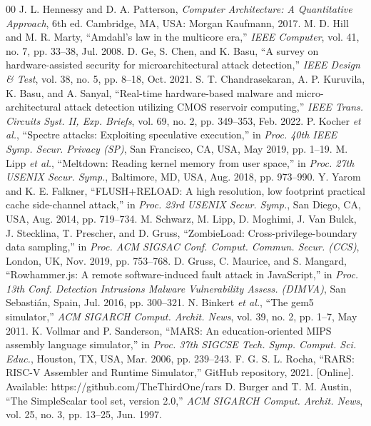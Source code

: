 \documentclass[journal,twocolumn,10pt]{IEEEtran}
\begin{document}
\begin{thebibliography}{00}
 J. L. Hennessy and D. A. Patterson, \textit{Computer Architecture: A Quantitative Approach}, 6th ed. Cambridge, MA, USA: Morgan Kaufmann, 2017.
 M. D. Hill and M. R. Marty, ``Amdahl's law in the multicore era,'' \textit{IEEE Computer}, vol. 41, no. 7, pp. 33--38, Jul. 2008.
 D. Ge, S. Chen, and K. Basu, ``A survey on hardware-assisted security for microarchitectural attack detection,'' \textit{IEEE Design \& Test}, vol. 38, no. 5, pp. 8--18, Oct. 2021.
 S. T. Chandrasekaran, A. P. Kuruvila, K. Basu, and A. Sanyal, ``Real-time hardware-based malware and micro-architectural attack detection utilizing CMOS reservoir computing,'' \textit{IEEE Trans. Circuits Syst. II, Exp. Briefs}, vol. 69, no. 2, pp. 349--353, Feb. 2022.
 P. Kocher \textit{et al.}, ``Spectre attacks: Exploiting speculative execution,'' in \textit{Proc. 40th IEEE Symp. Secur. Privacy (SP)}, San Francisco, CA, USA, May 2019, pp. 1--19.
 M. Lipp \textit{et al.}, ``Meltdown: Reading kernel memory from user space,'' in \textit{Proc. 27th USENIX Secur. Symp.}, Baltimore, MD, USA, Aug. 2018, pp. 973--990.
 Y. Yarom and K. E. Falkner, ``FLUSH+RELOAD: A high resolution, low footprint practical cache side-channel attack,'' in \textit{Proc. 23rd USENIX Secur. Symp.}, San Diego, CA, USA, Aug. 2014, pp. 719--734.
 M. Schwarz, M. Lipp, D. Moghimi, J. Van Bulck, J. Stecklina, T. Prescher, and D. Gruss, ``ZombieLoad: Cross-privilege-boundary data sampling,'' in \textit{Proc. ACM SIGSAC Conf. Comput. Commun. Secur. (CCS)}, London, UK, Nov. 2019, pp. 753--768.
 D. Gruss, C. Maurice, and S. Mangard, ``Rowhammer.js: A remote software-induced fault attack in JavaScript,'' in \textit{Proc. 13th Conf. Detection Intrusions Malware Vulnerability Assess. (DIMVA)}, San Sebasti\'an, Spain, Jul. 2016, pp. 300--321.
 N. Binkert \textit{et al.}, ``The gem5 simulator,'' \textit{ACM SIGARCH Comput. Archit. News}, vol. 39, no. 2, pp. 1--7, May 2011.
 K. Vollmar and P. Sanderson, ``MARS: An education-oriented MIPS assembly language simulator,'' in \textit{Proc. 37th SIGCSE Tech. Symp. Comput. Sci. Educ.}, Houston, TX, USA, Mar. 2006, pp. 239--243.
 F. G. S. L. Rocha, ``RARS: RISC-V Assembler and Runtime Simulator,'' GitHub repository, 2021. [Online]. Available: https://github.com/TheThirdOne/rars
 D. Burger and T. M. Austin, ``The SimpleScalar tool set, version 2.0,'' \textit{ACM SIGARCH Comput. Archit. News}, vol. 25, no. 3, pp. 13--25, Jun. 1997.

\end{thebibliography}
\end{document}
